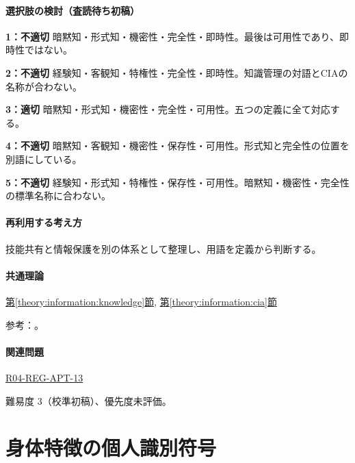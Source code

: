 \paragraph{選択肢の検討（査読待ち初稿）}\mbox{}\par

\noindent\textbf{1：不適切} 暗黙知・形式知・機密性・完全性・即時性。最後は可用性であり、即時性ではない。\par

\noindent\textbf{2：不適切} 経験知・客観知・特権性・完全性・即時性。知識管理の対語とCIAの名称が合わない。\par

\noindent\textbf{3：適切} 暗黙知・形式知・機密性・完全性・可用性。五つの定義に全て対応する。\par

\noindent\textbf{4：不適切} 暗黙知・客観知・機密性・保存性・可用性。形式知と完全性の位置を別語にしている。\par

\noindent\textbf{5：不適切} 経験知・形式知・特権性・保存性・可用性。暗黙知・機密性・完全性の標準名称に合わない。\par

\paragraph{再利用する考え方} 技能共有と情報保護を別の体系として整理し、用語を定義から判断する。

\paragraph{共通理論} \hyperref[theory:information:knowledge]{第\ref*{theory:information:knowledge}節}, \hyperref[theory:information:cia]{第\ref*{theory:information:cia}節}

\par 参考：\cite{jaist_knowledge,iso27000_2009}。

\paragraph{関連問題} \hyperref[q:r04-reg-apt-13]{R04-REG-APT-13}

\par 難易度 3（校準初稿）、優先度未評価。

\section{身体特徴の個人識別符号}

